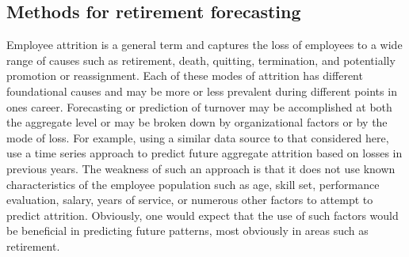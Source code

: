 \documentclass[12pt,letterpaper]{article}
\begin{document}
\subsection{Methods for retirement forecasting}

Employee attrition is a general term and captures the loss of employees to a wide range of causes such as retirement, death, quitting, termination, and potentially promotion or reassignment. Each of these modes of attrition has different foundational causes and may be more or less prevalent during different points in ones career.  Forecasting or prediction of turnover may be accomplished at both the aggregate level or may be broken down by organizational factors or by the mode of loss.  For example, using a similar data source to that considered here, \citet{zhu2015} use a time series approach to predict future aggregate attrition based on losses in previous years.  The weakness of such an approach is that it does not use known characteristics of the employee population such as age, skill set, performance evaluation, salary, years of service, or numerous other factors to attempt to predict attrition.  Obviously, one would expect that the use of such factors would be beneficial in predicting future patterns, most obviously in areas such as retirement.

\end{document}
